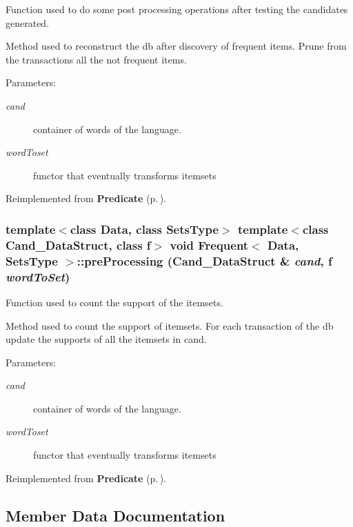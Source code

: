 Function used to do some post processing operations after testing the candidates generated. 

Method used to reconstruct the db after discovery of frequent items. Prune from the transactions all the not frequent items. \begin{Desc}
\item[Parameters:]
\begin{description}
\item[{\em cand}]container of words of the language. \item[{\em word\-Toset}]functor that eventually transforms itemsets \end{description}
\end{Desc}


Reimplemented from {\bf Predicate} {\rm (p.\,\pageref{class_predicate_49f7acb334fac851a26a4d1aecc64571})}.
\subsubsection{\setlength{\rightskip}{0pt plus 5cm}template$<$class Data, class Sets\-Type$>$ template$<$class Cand\_\-Data\-Struct, class f$>$ void {\bf Frequent}$<$ Data, Sets\-Type $>$::pre\-Processing (Cand\_\-Data\-Struct \& {\em cand}, f {\em word\-To\-Set})}\label{class_frequent_236bb06ebfac503436c8a25a8507b467}


Function used to count the support of the itemsets. 

Method used to count the support of itemsets. For each transaction of the db update the supports of all the itemsets in cand. \begin{Desc}
\item[Parameters:]
\begin{description}
\item[{\em cand}]container of words of the language. \item[{\em word\-Toset}]functor that eventually transforms itemsets \end{description}
\end{Desc}


Reimplemented from {\bf Predicate} {\rm (p.\,\pageref{class_predicate_8ee59d790e9b46e5e0555dbeb5b91f95})}.

\subsection{Member Data Documentation}

